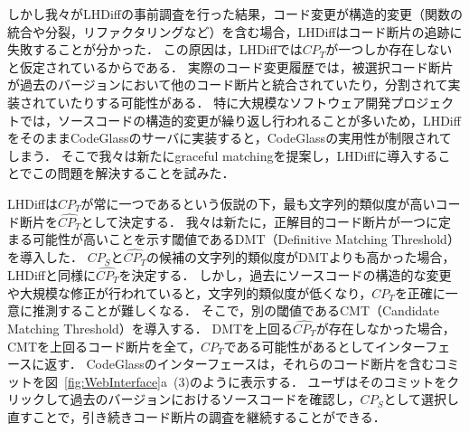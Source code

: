 しかし我々がLHDiffの事前調査を行った結果，コード変更が構造的変更（関数の統合や分裂，リファクタリングなど）を含む場合，LHDiffはコード断片の追跡に失敗することが分かった．
この原因は，LHDiffでは$CP_T$が一つしか存在しないと仮定されているからである．
実際のコード変更履歴では，被選択コード断片が過去のバージョンにおいて他のコード断片と統合されていたり，分割されて実装されていたりする可能性がある．
特に大規模なソフトウェア開発プロジェクトでは，ソースコードの構造的変更が繰り返し行われることが多いため，LHDiffをそのままCodeGlassのサーバに実装すると，CodeGlassの実用性が制限されてしまう．
そこで我々は新たにgraceful matchingを提案し，LHDiffに導入することでこの問題を解決することを試みた．



LHDiffは$CP_T$が常に一つであるという仮説の下，最も文字列的類似度が高いコード断片を$\widehat{CP_T}$として決定する．
我々は新たに，正解目的コード断片が一つに定まる可能性が高いことを示す閾値であるDMT（Definitive Matching Threshold）を導入した．
$CP_{S}$と$\widehat{CP_T}$の候補の文字列的類似度がDMTよりも高かった場合，LHDiffと同様に$\widehat{CP_T}$を決定する．
しかし，過去にソースコードの構造的な変更や大規模な修正が行われていると，文字列的類似度が低くなり，$CP_{T}$を正確に一意に推測することが難しくなる．
そこで，別の閾値であるCMT（Candidate Matching Threshold）を導入する．
DMTを上回る$\widehat{CP_T}$が存在しなかった場合，CMTを上回るコード断片を全て，$CP_{T}$である可能性があるとしてインターフェースに返す．
CodeGlassのインターフェースは，それらのコード断片を含むコミットを図~\ref{fig:WebInterface}a~(3)のように表示する．
ユーザはそのコミットをクリックして過去のバージョンにおけるソースコードを確認し，$CP_S$として選択し直すことで，引き続きコード断片の調査を継続することができる．



